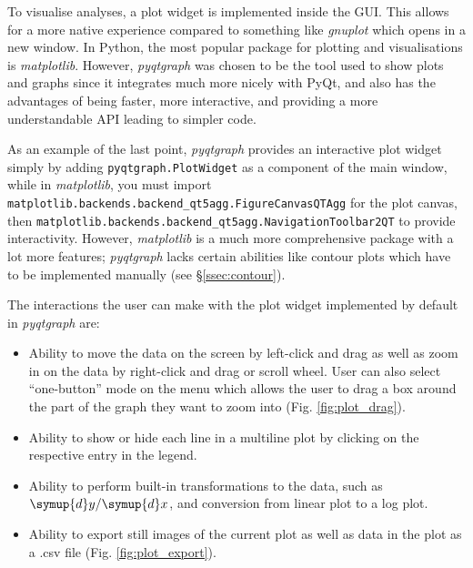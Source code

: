 \documentclass[12pt]{article}
\begin{document}
To visualise analyses, a plot widget is implemented inside the GUI. This allows for a more native experience compared to something like \textit{gnuplot} which opens in a new window. In Python, the most popular package for plotting and visualisations is \textit{matplotlib}. However, \textit{pyqtgraph} was chosen to be the tool used to show plots and graphs since it integrates much more nicely with PyQt, and also has the advantages of being faster, more interactive, and providing a more understandable API leading to simpler code.

As an example of the last point, \textit{pyqtgraph} provides an interactive plot widget simply by adding \texttt{pyqtgraph.PlotWidget} as a component of the main window, while in \textit{matplotlib}, you must import \texttt{matplotlib.backends.backend\_qt5agg.FigureCanvasQTAgg} for the plot canvas, then \texttt{matplotlib.backends.backend\_qt5agg.NavigationToolbar2QT} to provide interactivity. However, \textit{matplotlib} is a much more comprehensive package with a lot more features; \textit{pyqtgraph} lacks certain abilities like contour plots which have to be implemented manually (see \S\ref{ssec:contour}).

The interactions the user can make with the plot widget implemented by default in \textit{pyqtgraph} are:
\begin{itemize}
    \item Ability to move the data on the screen by left-click and drag as well as zoom in on the data by right-click and drag or scroll wheel. User can also select ``one-button'' mode on the menu which allows the user to drag a box around the part of the graph they want to zoom into (Fig. \ref{fig:plot_drag}).
    \item Ability to show or hide each line in a multiline plot by clicking on the respective entry in the legend.
    \item Ability to perform built-in transformations to the data, such as \(\symup{d}y/\symup{d}x\), and conversion from linear plot to a log plot.
    \item Ability to export still images of the current plot as well as data in the plot as a .csv file (Fig. \ref{fig:plot_export}).
\end{itemize}
\end{document}

